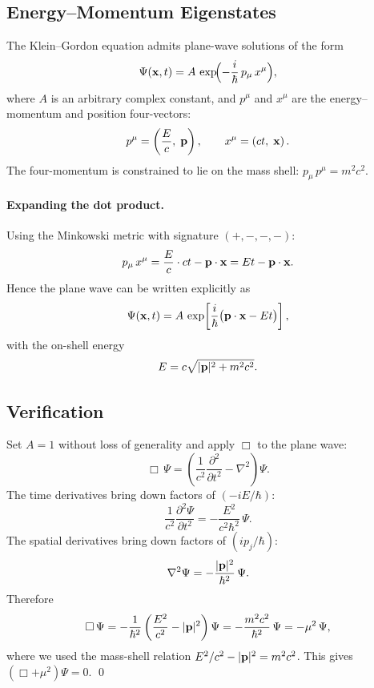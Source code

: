 \documentclass[12pt, a4paper]{article}
\theoremstyle{definition}
\begin{document}
\subsection{Energy--Momentum Eigenstates}

The Klein--Gordon equation admits plane-wave solutions of the form
\begin{equation}\label{eq:plane-wave-4vec}
    \Psi(\vb{x},t)
    = A\,\exp\!\Bigl(-\frac{i}{\hbar}\,p_{\mu}\,x^{\mu}\Bigr),
\end{equation}
where $A$ is an arbitrary complex constant, and $p^{\mu}$ and $x^{\mu}$ are
the energy--momentum and position four-vectors:
\begin{equation}
    p^{\mu} = \left(\frac{E}{c},\;\vb{p}\right),
    \qquad
    x^{\mu} = \left(ct,\;\vb{x}\right).
\end{equation}
The four-momentum is constrained to lie on the mass shell:
$p_{\mu}\,p^{\mu} = m^{2}c^{2}$.

\paragraph{Expanding the dot product.}
Using the Minkowski metric with signature $(+,-,-,-)$:
\begin{equation}
    p_{\mu}\,x^{\mu}
    = \frac{E}{c}\cdot ct - \vb{p}\cdot\vb{x}
    = Et - \vb{p}\cdot\vb{x}.
\end{equation}
Hence the plane wave can be written explicitly as
\begin{equation}\label{eq:plane-wave-explicit}
    \Psi(\vb{x},t)
    = A\,\exp\!\left[\frac{i}{\hbar}
      \bigl(\vb{p}\cdot\vb{x} - Et\bigr)\right],
\end{equation}
with the on-shell energy
\begin{equation}\label{eq:energy-on-shell}
    E = c\sqrt{|\vb{p}|^{2} + m^{2}c^{2}}.
\end{equation}

\subsection{Verification}

\begin{derivation}
Set $A=1$ without loss of generality and apply $\Box$ to the plane wave:
\[
    \Box\,\Psi
    = \left(\frac{1}{c^{2}}\frac{\partial^{2}}{\partial t^{2}}
      - \nabla^{2}\right)\Psi.
\]
The time derivatives bring down factors of $(-iE/\hbar)$:
\[
    \frac{1}{c^{2}}\frac{\partial^{2}\Psi}{\partial t^{2}}
    = -\frac{E^{2}}{c^{2}\hbar^{2}}\,\Psi.
\]
The spatial derivatives bring down factors of $(ip_{j}/\hbar)$:
\[
    \nabla^{2}\Psi
    = -\frac{|\vb{p}|^{2}}{\hbar^{2}}\,\Psi.
\]
Therefore
\[
    \Box\,\Psi
    = -\frac{1}{\hbar^{2}}
      \left(\frac{E^{2}}{c^{2}} - |\vb{p}|^{2}\right)\Psi
    = -\frac{m^{2}c^{2}}{\hbar^{2}}\,\Psi
    = -\mu^{2}\,\Psi,
\]
where we used the mass-shell relation $E^{2}/c^{2} - |\vb{p}|^{2} = m^{2}c^{2}$.
This gives $(\Box + \mu^{2})\Psi = 0$.  \qed
\end{derivation}
\end{document}
